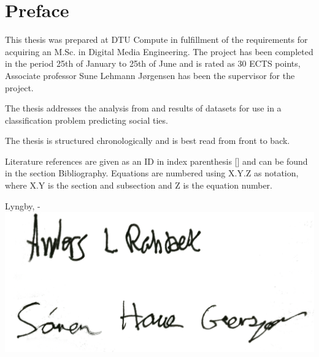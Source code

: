 \chapter{Preface}
This thesis was prepared at DTU Compute in fulfillment of the requirements for acquiring an M.Sc. in Digital Media Engineering.
The project has been completed in the period 25th of January to 25th of June and is rated as 30 ECTS points, Associate professor Sune Lehmann Jørgensen has been the supervisor for the project.

The thesis addresses the analysis from and results of datasets for use in a classification problem predicting social ties.

The thesis is structured chronologically and is best read from front to back.

Literature references are given as an ID in index parenthesis [] and can be found in the section Bibliography.
Equations are numbered using X.Y.Z as notation, where X.Y is the section and subsection and Z is the equation number.

\vspace{12mm}
\begin{center}
    \hspace{20mm} Lyngby, \thesishandin-\thesisyear
    \vspace{2mm}
    \newline
    \includegraphics[scale=0.05]{figures/signature}
\end{center}
\begin{flushright}
    \thesisauthor
\end{flushright}
